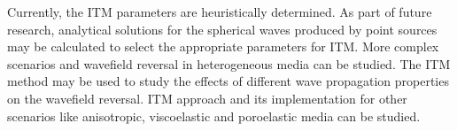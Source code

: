 Currently, the \ac{ITM} parameters are heuristically determined. As part of future research, analytical solutions for the spherical waves produced by point sources may be calculated to select the appropriate parameters for \ac{ITM}. More complex scenarios and wavefield reversal in heterogeneous media can be studied. 
The \ac{ITM} method may be used to study the effects of different wave propagation properties on the wavefield reversal. \ac{ITM} approach and its implementation 
for other scenarios like anisotropic, viscoelastic and poroelastic media can be studied. \\
